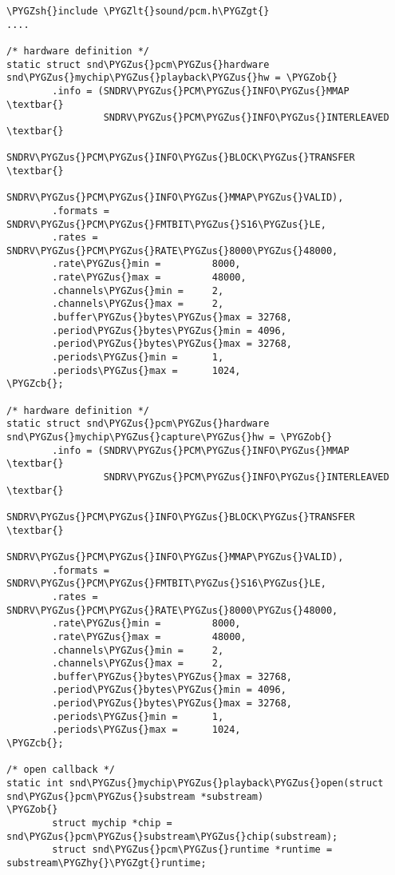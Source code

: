 \documentclass[a4paper,8pt,english]{sphinxmanual}
\def\PYGZus{\char`\_}
\def\PYGZob{\char`\{}
\def\PYGZcb{\char`\}}
\def\PYGZlt{\char`\<}
\def\PYGZgt{\char`\>}
\def\PYGZsh{\char`\#}
\def\PYGZhy{\char`\-}
\begin{document}
\begin{Verbatim}[commandchars=\\\{\}]
\PYGZsh{}include \PYGZlt{}sound/pcm.h\PYGZgt{}
....

/* hardware definition */
static struct snd\PYGZus{}pcm\PYGZus{}hardware snd\PYGZus{}mychip\PYGZus{}playback\PYGZus{}hw = \PYGZob{}
        .info = (SNDRV\PYGZus{}PCM\PYGZus{}INFO\PYGZus{}MMAP \textbar{}
                 SNDRV\PYGZus{}PCM\PYGZus{}INFO\PYGZus{}INTERLEAVED \textbar{}
                 SNDRV\PYGZus{}PCM\PYGZus{}INFO\PYGZus{}BLOCK\PYGZus{}TRANSFER \textbar{}
                 SNDRV\PYGZus{}PCM\PYGZus{}INFO\PYGZus{}MMAP\PYGZus{}VALID),
        .formats =          SNDRV\PYGZus{}PCM\PYGZus{}FMTBIT\PYGZus{}S16\PYGZus{}LE,
        .rates =            SNDRV\PYGZus{}PCM\PYGZus{}RATE\PYGZus{}8000\PYGZus{}48000,
        .rate\PYGZus{}min =         8000,
        .rate\PYGZus{}max =         48000,
        .channels\PYGZus{}min =     2,
        .channels\PYGZus{}max =     2,
        .buffer\PYGZus{}bytes\PYGZus{}max = 32768,
        .period\PYGZus{}bytes\PYGZus{}min = 4096,
        .period\PYGZus{}bytes\PYGZus{}max = 32768,
        .periods\PYGZus{}min =      1,
        .periods\PYGZus{}max =      1024,
\PYGZcb{};

/* hardware definition */
static struct snd\PYGZus{}pcm\PYGZus{}hardware snd\PYGZus{}mychip\PYGZus{}capture\PYGZus{}hw = \PYGZob{}
        .info = (SNDRV\PYGZus{}PCM\PYGZus{}INFO\PYGZus{}MMAP \textbar{}
                 SNDRV\PYGZus{}PCM\PYGZus{}INFO\PYGZus{}INTERLEAVED \textbar{}
                 SNDRV\PYGZus{}PCM\PYGZus{}INFO\PYGZus{}BLOCK\PYGZus{}TRANSFER \textbar{}
                 SNDRV\PYGZus{}PCM\PYGZus{}INFO\PYGZus{}MMAP\PYGZus{}VALID),
        .formats =          SNDRV\PYGZus{}PCM\PYGZus{}FMTBIT\PYGZus{}S16\PYGZus{}LE,
        .rates =            SNDRV\PYGZus{}PCM\PYGZus{}RATE\PYGZus{}8000\PYGZus{}48000,
        .rate\PYGZus{}min =         8000,
        .rate\PYGZus{}max =         48000,
        .channels\PYGZus{}min =     2,
        .channels\PYGZus{}max =     2,
        .buffer\PYGZus{}bytes\PYGZus{}max = 32768,
        .period\PYGZus{}bytes\PYGZus{}min = 4096,
        .period\PYGZus{}bytes\PYGZus{}max = 32768,
        .periods\PYGZus{}min =      1,
        .periods\PYGZus{}max =      1024,
\PYGZcb{};

/* open callback */
static int snd\PYGZus{}mychip\PYGZus{}playback\PYGZus{}open(struct snd\PYGZus{}pcm\PYGZus{}substream *substream)
\PYGZob{}
        struct mychip *chip = snd\PYGZus{}pcm\PYGZus{}substream\PYGZus{}chip(substream);
        struct snd\PYGZus{}pcm\PYGZus{}runtime *runtime = substream\PYGZhy{}\PYGZgt{}runtime;


\end{Verbatim}
\end{document}
